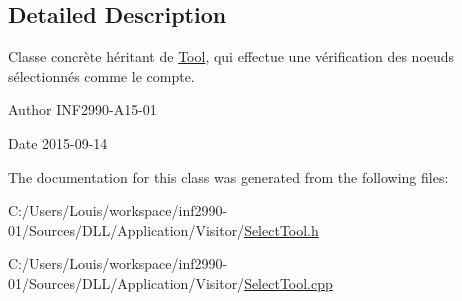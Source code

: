 \subsection{Detailed Description}
Classe concrète héritant de \hyperlink{class_tool}{Tool}, qui effectue une vérification des noeuds sélectionnés comme le compte. 

\begin{DoxyAuthor}{Author}
I\+N\+F2990-\/\+A15-\/01 
\end{DoxyAuthor}
\begin{DoxyDate}{Date}
2015-\/09-\/14 
\end{DoxyDate}


The documentation for this class was generated from the following files\+:\begin{DoxyCompactItemize}
\item 
C\+:/\+Users/\+Louis/workspace/inf2990-\/01/\+Sources/\+D\+L\+L/\+Application/\+Visitor/\hyperlink{_select_tool_8h}{Select\+Tool.\+h}\item 
C\+:/\+Users/\+Louis/workspace/inf2990-\/01/\+Sources/\+D\+L\+L/\+Application/\+Visitor/\hyperlink{_select_tool_8cpp}{Select\+Tool.\+cpp}\end{DoxyCompactItemize}
